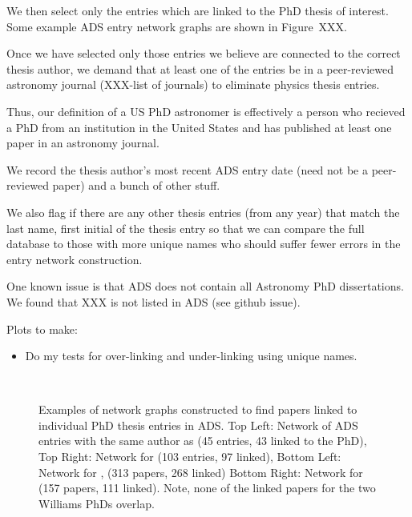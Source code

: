 \documentclass{emulateapj}
\begin{document}
We then select only the entries which are linked to the PhD thesis of interest.  Some example ADS entry network graphs are shown in Figure~XXX.

Once we have selected only those entries we believe are connected to the correct thesis author, we demand that at least one of the entries be in a peer-reviewed astronomy journal (XXX-list of journals) to eliminate physics thesis entries.

Thus, our definition of a US PhD astronomer is effectively a person who recieved a PhD from an institution in the United States and has published at least one paper in an astronomy journal.

We record the thesis author's most recent ADS entry date (need not be a peer-reviewed paper)  and a bunch of other stuff.

We also flag if there are any other thesis entries (from any year) that match the last name, first initial of the thesis entry so that we can compare the full database to those with more unique names who should suffer fewer errors in the entry network construction.

One known issue is that ADS does not contain all Astronomy PhD dissertations. We found that XXX is not listed in ADS (see github issue).


Plots to make:
\begin{itemize}
\item{Do my tests for over-linking and under-linking using unique names.}
\end{itemize}


\begin{figure*}
  \\
        \caption{Examples of network graphs constructed to find papers linked to individual PhD thesis entries in ADS.   Top Left: Network of ADS entries with the same author as \citet{Yoachim07} (45 entries, 43 linked to the PhD), Top Right: Network for \citet{Bellm2011} (103 entries, 97 linked), Bottom Left: Network for \citet{Williams02}, (313 papers, 268 linked) Bottom Right: Network for \citet{Williams11} (157 papers, 111 linked).  Note, none of the linked papers for the two Williams PhDs overlap. \label{fig:example_networks}}
\end{figure*}

\end{document}

